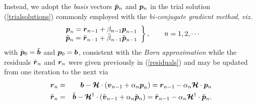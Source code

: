Instead, we adopt the {\em basis\/} vectors $\tilde{\bmi  p}{}_{n}$ and 
${\bmi  
p}{}_{n}$
in the trial solution (\ref{trialsolutions}) 
commonly employed with the 
{\em bi-conjugate gradient method\/}, {\em viz.\/}
\begin{equation} \label{pupdate}
\left.\begin{array}{c}
{\bmi  p}_{n}= {\bmi  r}_{n-1}+{ \beta }_{n-1}{\bmi  p}_{n-1}\\
\tilde{\bmi  p}{}_{n}= \tilde{\bmi  r}{}_{n-1}+\tilde{ \beta 
}{}_{n-1}\tilde{\bmi  p}{}_{n-1}
\end{array}\right\}, \qquad n=1,2,\cdots
\end{equation}
with $\tilde{\bmi  p}{}_{0}=\tilde{\bmi  b}$ and ${\bmi  p}{}_{0}={\bmi  
b}$, 
consistent with the {\em Born approximation\/}
while the  residuals $\tilde{\bmi  r}{}_{n}$ and ${\bmi  r}_{n}$ were 
given 
previously in (\ref{residuals}) and may be updated from one iteration to 
the next via
\begin{eqnarray} \label{residualupdate}
{{\bmi  r}}_{n}&=& {{ \bmi   b}}  -{\CB H} \cdot \left({\bmi  v}_{  n-1} + 
\alpha_n {\bmi  p}_{  n} \right)
= {{ \bmi   r}}_{n-1}  - \alpha{}_n {\CB H} \cdot  {\bmi  p}{}_{  n}
\nonumber\\ 
{\tilde{\bmi  r}}_{n}&=& {\tilde{ \bmi   b}}  -{\CB H}^{\dagger} \cdot 
\left(\tilde{\bmi  
v}{}_{  n-1} + 
{\alpha}{}_n \tilde{\bmi  p}{}_{  n} \right)
= {\tilde{ \bmi   r}}_{n-1}  - {\alpha}{}_n {\CB H}^{\dagger} \cdot  
\tilde{\bmi  
p}{}_{  n}.
\end{eqnarray}



